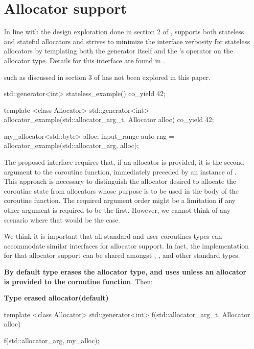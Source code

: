 \documentclass{wg21}
\begin{document}
\section{Allocator support}

In line with the design exploration done in section 2 of ,  supports both stateless and stateful allocators and strives to minimize the interface verbosity for stateless allocators by templating both the generator itself and the 's  operator
on the allocator type. Details for this interface are found in .

 such as discussed in section 3 of  has not been explored in this paper.

\begin{colorblock}
    std::generator<int> stateless_example() {
        co_yield 42;
    }

    template <class Allocator>
    std::generator<int> allocator_example(std::allocator_arg_t, Allocator alloc) {
        co_yield 42;
    }

    my_allocator<std::byte> alloc;
    input_range auto rng = allocator_example(std::allocator_arg, alloc);
\end{colorblock}

The proposed interface requires that, if an allocator is provided, it is the second argument to the coroutine function,
immediately preceded by an instance of .
This approach is necessary to distinguish the allocator desired to allocate the coroutine state from allocators whose purpose is to be used in the body of the coroutine function.
The required argument order might be a limitation if any other argument is required to be the first. However, we cannot think of any scenario where that would be the case.

We think it is important that all standard and user coroutines types can accommodate similar interfaces for allocator support.
In fact, the implementation for that allocator support can be shared amongst , , and other standard types.

\textbf{By default  type erases the allocator type, and uses  unless an allocator is provided to
the coroutine function}.
Then:

\textbf{Type erased allocator(default)}

\begin{colorblock}
template <class Allocator>
std::generator<int> f(std::allocator_arg_t, Allocator alloc) {}

f(std::allocator_arg, my_alloc{});
\end{colorblock}
\end{document}
